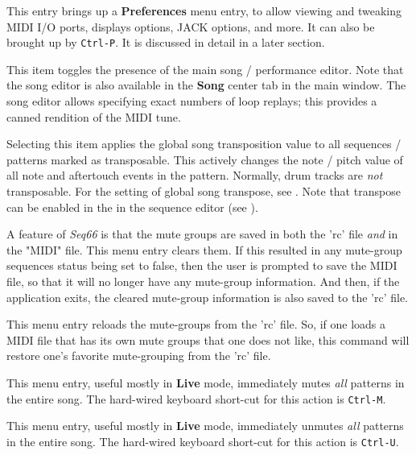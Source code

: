    This entry brings up a \textbf{Preferences} menu entry,
   to allow viewing and tweaking MIDI I/O ports, displays options, JACK
   options, and more.
   It can also be brought up by \texttt{Ctrl-P}.
   It is discussed in detail in a later section.

   This item toggles the presence of the main song / performance editor.
   Note that the song editor is also available in the
   \textbf{Song} center tab in the main window.
   The song editor allows specifying exact numbers of loop replays;
   this provides a canned rendition of the MIDI tune.

   Selecting this item applies the global song transposition value to
   all sequences / patterns marked as transposable.
   This actively changes the note / pitch value of all note and aftertouch
   events in the pattern.
   Normally, drum tracks are \textsl{not} transposable.
   For the setting of global song transpose, see
   .
   Note that transpose can be enabled in the
   in the sequence editor
   (see ).

   A feature of \textsl{Seq66} is that the mute groups
   are saved in both the 'rc' file \textsl{and} in the "MIDI" file.
   This menu entry clears them. If this resulted in any mute-group sequences
   status being set to false, then the user is prompted to save the MIDI
   file, so that it will no longer have any
   mute-group information.  And then, if the
   application exits, the cleared mute-group information is also saved to
   the 'rc' file.

   This menu entry reloads the mute-groups from the 'rc' file.
   So, if one loads a MIDI file that has its own mute groups that one does not
   like, this command will restore one's favorite mute-grouping from the 'rc'
   file.

   This menu entry, useful mostly in \textbf{Live} mode,
   immediately mutes \textsl{all} patterns in the entire song.
   The hard-wired keyboard short-cut for this action is \texttt{Ctrl-M}.

   This menu entry, useful mostly in \textbf{Live} mode,
   immediately unmutes \textsl{all} patterns in the entire song.
   The hard-wired keyboard short-cut for this action is \texttt{Ctrl-U}.

